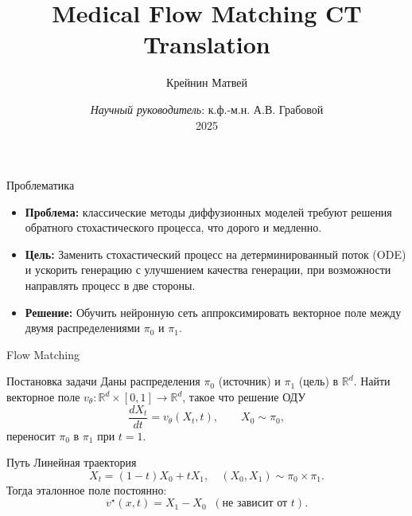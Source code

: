 \documentclass[11pt]{beamer}
\title{Medical Flow Matching CT Translation}
\author{Крейнин Матвей}
\institute[MIPT]{Московский физико-технический институт \\ Кафедра интеллектуальных систем}
\date[2025]{\textit{Научный руководитель}: к.ф.-м.н. А.В. Грабовой \\ 2025}
\begin{document}
\begin{frame}
  \titlepage
\end{frame}

\begin{frame}{Проблематика}
\begin{itemize}
  \item \textbf{Проблема:} классические методы диффузионных моделей требуют решения обратного стохастического процесса, что дорого и медленно.
  \item \textbf{Цель:} Заменить стохастический процесс на детерминированный поток (ODE) и ускорить генерацию с улучшением качества генерации, при возможности направлять процесс в две стороны.
  \item \textbf{Решение:} Обучить нейронную сеть аппроксимировать векторное поле между двумя распределениями $\pi_{0}$ и $\pi_{1}$.
\end{itemize}
\end{frame}


\begin{frame}{Flow Matching}

\begin{block}{Постановка задачи}
Даны распределения $\pi_0$ (источник) и $\pi_1$ (цель) в $\mathbb R^d$.
Найти векторное поле $v_\theta:\mathbb R^d\times[0,1]\!\to\!\mathbb R^d$,  
такое что решение ОДУ
\[
\frac{d X_t}{dt}=v_\theta(X_t,t),\qquad X_0\sim \pi_0,
\]
переносит $\pi_0$ в $\pi_1$ при $t=1$.
\end{block}

\begin{block}{Путь}
Линейная траектория
\[
X_t=(1-t)X_0+tX_1,\quad (X_0,X_1)\sim \pi_0\times \pi_1.
\]
Тогда эталонное поле постоянно:
\[
v^{\star}(x,t)=X_1-X_0\;\;(\text{не зависит от }t).
\]
\end{block}

\end{frame}
\end{document}
